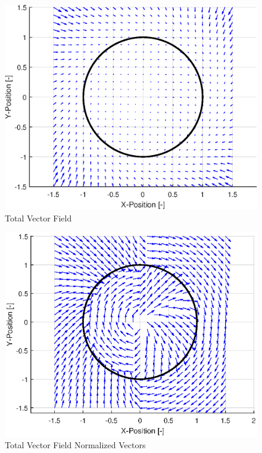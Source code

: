 \documentclass[conf]{new-aiaa}
\begin{document}
\begin{figure}[H]
	\centering
	\includegraphics[width=0.7\linewidth]{All}
	\caption{Total Vector Field}
	\label{fig:all}
\end{figure}
\begin{figure}[H]
	\centering
	\includegraphics[width=0.7\linewidth]{Allnorm}
	\caption{Total Vector Field Normalized Vectors}
	\label{fig:alln1}
\end{figure}
\end{document}
